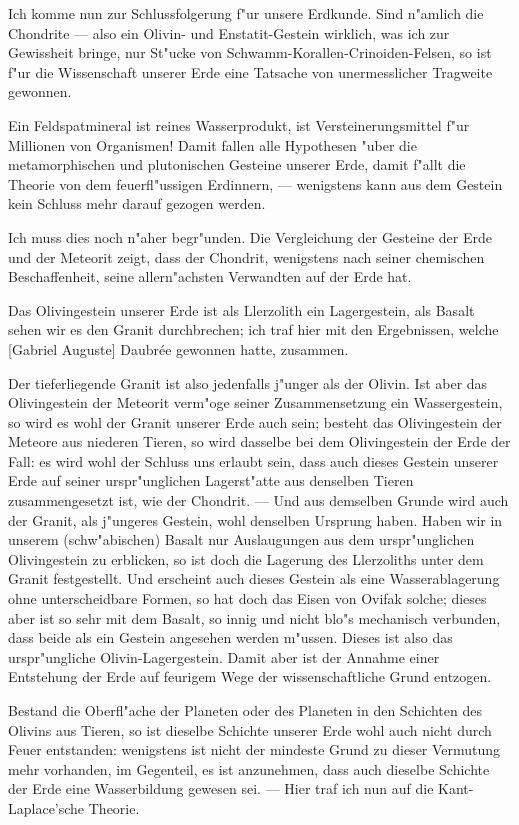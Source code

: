 \documentclass[a4paper, 11pt, oneside]{article}
\begin{document}
Ich komme nun zur Schlussfolgerung f"ur unsere Erdkunde. Sind n"amlich die Chondrite --- also ein Olivin- und Enstatit-Gestein wirklich, was ich zur Gewissheit bringe, nur St"ucke von Schwamm-Korallen-Crinoiden-Felsen, so ist f"ur die Wissenschaft unserer Erde eine Tatsache von unermesslicher Tragweite gewonnen.

Ein Feldspatmineral ist reines Wasserprodukt, ist Versteinerungsmittel f"ur Millionen von Organismen! Damit fallen alle Hypothesen "uber die metamorphischen und plutonischen Gesteine unserer Erde, damit f"allt die Theorie von dem feuerfl"ussigen Erdinnern, --- wenigstens kann aus dem Gestein kein Schluss mehr darauf gezogen werden.

Ich muss dies noch n"aher begr"unden. Die Vergleichung der Gesteine der Erde und der Meteorit zeigt, dass der Chondrit, wenigstens nach seiner chemischen Beschaffenheit, seine allern"achsten Verwandten auf der Erde hat.

Das Olivingestein unserer Erde ist als Llerzolith ein Lagergestein, als Basalt sehen wir es den Granit durchbrechen; ich traf hier mit den Ergebnissen, welche [Gabriel Auguste] Daubrée gewonnen hatte, zusammen.

Der tieferliegende Granit ist also jedenfalls j"unger als der Olivin. Ist aber das Olivingestein der Meteorit verm"oge seiner Zusammensetzung ein Wassergestein, so wird es wohl der Granit unserer Erde auch sein; besteht das Olivingestein der Meteore aus niederen Tieren, so wird dasselbe bei dem Olivingestein der Erde der Fall: es wird wohl der Schluss uns erlaubt sein, dass auch dieses Gestein unserer Erde auf seiner urspr"unglichen Lagerst"atte aus denselben Tieren zusammengesetzt ist, wie der Chondrit. --- Und aus demselben Grunde wird auch der Granit, als j"ungeres Gestein, wohl denselben Ursprung haben. Haben wir in unserem (schw"abischen) Basalt nur Auslaugungen aus dem urspr"unglichen Olivingestein zu erblicken, so ist doch die Lagerung des Llerzoliths unter dem Granit festgestellt. Und erscheint auch dieses Gestein als eine Wasserablagerung ohne unterscheidbare Formen, so hat doch das Eisen von Ovifak solche; dieses aber ist so sehr mit dem Basalt, so innig und nicht blo"s mechanisch verbunden, dass beide als ein Gestein angesehen werden m"ussen. Dieses ist also das urspr"ungliche Olivin-Lagergestein. Damit aber ist der Annahme einer Entstehung der Erde auf feurigem Wege der wissenschaftliche Grund entzogen.

Bestand die Oberfl"ache der Planeten oder des Planeten in den Schichten des Olivins aus Tieren, so ist dieselbe Schichte unserer Erde wohl auch nicht durch Feuer entstanden: wenigstens ist nicht der mindeste Grund zu dieser Vermutung mehr vorhanden, im Gegenteil, es ist anzunehmen, dass auch dieselbe Schichte der Erde eine Wasserbildung gewesen sei. --- Hier traf ich nun auf die Kant-Laplace'sche Theorie.
\end{document}
